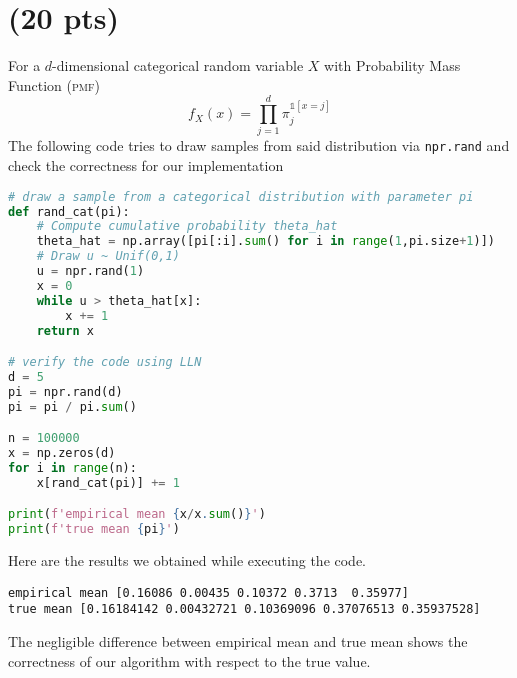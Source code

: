 \section{ (20 pts)}
For a $d$-dimensional categorical random variable $X$ with Probability Mass Function (\textsc{pmf})
\begin{equation*}
	f_X(x) = \prod_{j=1}^d \pi_j^{\mathds{1}\left[x=j\right]}
\end{equation*}
The following code tries to draw samples from said distribution via \verb|npr.rand| and check the correctness for our implementation
\begin{lstlisting}[language=Python]
# draw a sample from a categorical distribution with parameter pi
def rand_cat(pi):
	# Compute cumulative probability theta_hat
	theta_hat = np.array([pi[:i].sum() for i in range(1,pi.size+1)])
	# Draw u ~ Unif(0,1)
	u = npr.rand(1)
	x = 0
	while u > theta_hat[x]:
		x += 1
	return x

# verify the code using LLN
d = 5
pi = npr.rand(d)
pi = pi / pi.sum()

n = 100000
x = np.zeros(d)
for i in range(n):
	x[rand_cat(pi)] += 1

print(f'empirical mean {x/x.sum()}')
print(f'true mean {pi}')
\end{lstlisting}
Here are the results we obtained while executing the code.
\begin{verbatim}
empirical mean [0.16086 0.00435 0.10372 0.3713  0.35977]
true mean [0.16184142 0.00432721 0.10369096 0.37076513 0.35937528]
\end{verbatim}
The negligible difference between empirical mean and true mean shows the correctness of our algorithm with respect to the true value.
